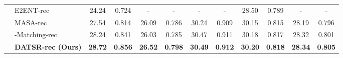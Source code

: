 \documentclass[runningheads]{llncs}
\begin{document}
\begin{table*}[t]
\begin{center}
{\begin{tabular}{|c|l|c|c|c|c|c|c|c|c|c|c|}
  & E2ENT-rec \cite{xie2020feature} & 24.24 & 0.724    & - & -              & - & -              & 28.50 & 0.789   & - & -       \\
  & MASA-rec \cite{lu2021masa}     & 27.54 & 0.814    & 26.09 & 0.786  & 30.24 & 0.909   & 30.15 & 0.815   & 28.19 & 0.796 \\
  & -Matching-rec \cite{jiang2021robust} & 28.24 & 0.841    & 26.03 & 0.785   & 30.47 & 0.911   & 30.18 & 0.817   & 28.32 & 0.801 \\
   \cline{2-12}
   & \textbf{DATSR-rec (Ours)}   & \textbf{28.72} & \textbf{0.856}   & \textbf{26.52} & \textbf{0.798}      & \textbf{30.49} & \textbf{0.912} & \textbf{30.20} & \textbf{0.818}   & \textbf{28.34} & \textbf{0.805} \\
\hline
\end{tabular}
}
\end{center}
\label{tab:quan_comp_rec}
\end{table*}
\end{document}
